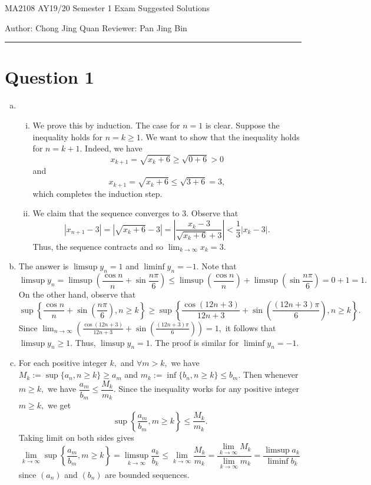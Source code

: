 \documentclass{article}
\begin{document}
    {\LARGE{MA2108 AY19/20 Semester 1 Exam Suggested Solutions}}
    \vspace{0.2in}
    
    Author: Chong Jing Quan \hfill Reviewer: Pan Jing Bin
    
    \par\noindent\rule{\textwidth}{0.4pt}
\section*{Question 1}
\begin{enumerate}[(a)]
    \item \begin{enumerate}[(i)]
        \item We prove this by induction. The case for $n=1$ is clear. Suppose the inequality holds for $n=k\geq1.$ We want to show that the inequality holds for $n=k+1.$ Indeed, we have $$x_{k+1}=\sqrt{x_k+6}\geq\sqrt{0+6}>0$$ and $$x_{k+1}=\sqrt{x_k+6}\leq\sqrt{3+6}=3,$$ which completes the induction step.
        \item We claim that the sequence converges to 3. Observe that $$|x_{n+1}-3|=|\sqrt{x_k+6}-3|=\left|\frac{x_k-3}{\sqrt{x_k+6}+3}\right|<\frac{1}{3}|x_k-3|.$$ Thus, the sequence contracts and so $\displaystyle\lim_{k\to\infty}x_k=3.$
    \end{enumerate}
    \item The answer is $\limsup y_n=1$ and $\liminf y_n=-1.$ Note that
    $$\limsup y_n=\limsup \left(\frac{\cos n}{n}+\sin\frac{n\pi}{6}\right)\leq\limsup\left(\frac{\cos n}{n}\right)+\limsup\left(\sin\frac{n\pi}{6}\right)=0+1=1.$$
    On the other hand, observe that $$\sup\left\{\frac{\cos n}{n}+\sin\left(\frac{n\pi}{6}\right),n\geq k\right\}\geq \sup\left\{\frac{\cos(12n+3)}{12n+3}+\sin\left(\frac{(12n+3)\pi}{6}\right),n\geq k\right\}.$$
    Since $\displaystyle\lim_{n\to\infty}\left(\frac{\cos(12n+3)}{12n+3}+\sin\left(\frac{(12n+3)\pi}{6}\right)\right)=1,$ it follows that $\limsup y_n\geq1.$ Thus, $\limsup y_n=1.$ The proof is similar for $\liminf y_n=-1.$
    \item For each positive integer $k,$ and $\forall m > k,$ we have $M_k:=\sup \{a_n, n\geq k\}\geq a_m$ and $m_k:=\inf \{b_n, n\geq k\}\leq b_m$. Then whenever $m\geq k,$ we have $\dfrac{a_m}{b_m}\leq \dfrac{M_k}{m_k}.$ Since the inequality works for any positive integer $m\geq k,$ we get $$\sup\left\{\dfrac{a_m}{b_m},m\geq k\right\}\leq \dfrac{M_k}{m_k}.$$ Taking limit on both sides gives $$\lim_{k\to\infty}\sup\left\{\dfrac{a_m}{b_m},m\geq k\right\}=\limsup_{k\to\infty}\frac{a_k}{b_k}\leq \lim_{k\to\infty}\dfrac{M_k}{m_k}=\dfrac{\lim_{k\to\infty}M_k}{\lim_{k\to\infty}m_k}=\frac{\limsup a_k}{\liminf b_k}$$ since $(a_n)$ and $(b_n)$ are bounded sequences.
\end{enumerate}
\end{document}
